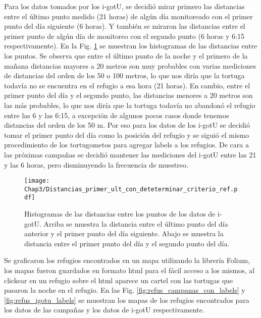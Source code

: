 Para los datos tomados por los i-gotU, se decidió mirar primero las distancias entre el último punto medido (21 horas) de algún día monitoreado con el primer punto del día siguiente (6 horas). Y también se miraron las distancias entre el primer punto de algún día de monitoreo con el segundo punto (6 horas y 6:15 respectivamente). En la Fig. \ref{fig:distancias} se muestran los histogramas de las distancias entre los puntos. Se observa que entre el último punto de la noche y el primero de la mañana distancias mayores a 20 metros son muy probables con varias mediciones de distancias del orden de los 50 o 100 metros, lo que nos diría que la tortuga todavía no se encuentra en el refugio a esa hora (21 horas). En cambio, entre el primer punto del día y el segundo punto, las distancias menores a 20 metros son las más probables, lo que nos diría que la tortuga todavía no abandonó el refugio entre las 6 y las 6:15, a excepción de algunos pocos casos donde tenemos distancias del orden de los 50 m. Por eso para los datos de los i-gotU se decidió tomar el primer punto del día como la posición del refugio y se siguió el mismo procedimiento de los tortugometos para agregar labels a los refugios. De cara a las próximas campañas se decidió mantener las mediciones del i-gotU entre las 21 y las 6 horas, pero disminuyendo la frecuencia de muestreo.
 
 
\begin{figure}[ht]
    \begin{center}
        \texttt{[image: Chap3/Distancias\_primer\_ult\_con\_deteterminar\_criterio\_ref.pdf]}
        \caption[Histogramas de las distancias entre los puntos de los datos de i-gotU.]{ Histogramas de las distancias entre los puntos de los datos de i-gotU. Arriba se muestra la distancia entre el último punto del día anterior y el primer punto del día siguiente. Abajo se muestra la distancia entre el primer punto del día y el segundo punto del día.}
        \label{fig:distancias}
        \end{center}
\end{figure}
 
Se graficaron los refugios encontrados en un mapa utilizando la librería Folium, los mapas fueron guardados en formato html para el fácil acceso a los mismos, al clickear en un refugio sobre el html aparece un cartel con las tortugas que pasaron la noche en el refugio. En las Fig. \ref{fig:refus_campanas_con_labels} y \ref{fig:refus_igotu_labels} se muestran los mapas de los refugios encontrados para los datos de las campañas y los datos de i-gotU respectivamente.
 
